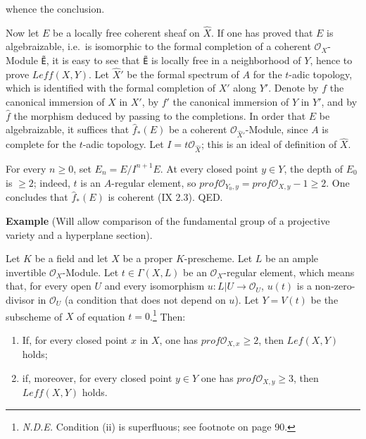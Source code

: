 \documentclass[
]{article}
\providecommand{\tightlist}{%
  \setlength{\itemsep}{0pt}\setlength{\parskip}{0pt}}
\begin{document}
whence the conclusion.

Now let \(E\) be a locally free coherent sheaf on \(\hat{X}\). If one
has proved that \(E\) is algebraizable, i.e.~is isomorphic to the formal
completion of a coherent \(\mathcal{O}_{X}\)-Module \texttt{Ẽ}, it is
easy to see that \texttt{Ẽ} is locally free in a neighborhood of \(Y\),
hence to prove \(Leff(X, Y)\). Let \(\hat{X}'\) be the formal spectrum
of \(A\) for the \(t\)-adic topology, which is identified with the
formal completion of \(X'\) along \(Y'\). Denote by \(f\) the canonical
immersion of \(X\) in \(X'\), by \(f'\) the canonical immersion of \(Y\)
in \(Y'\), and by \(\hat{f}\) the morphism deduced by passing to the
completions. In order that \(E\) be algebraizable, it suffices that
\(\hat{f}_{*}(E)\) be a coherent \(\mathcal{O}_{\hat{X}'}\)-Module,
since \(A\) is complete for the \(t\)-adic topology. Let
\(I = t\mathcal{O}_{\hat{X}}\); this is an ideal of definition of
\(\hat{X}\).

For every \(n \geqslant 0\), set \(E_{n} = E/I^{n+1}E\). At every closed
point \(y \in Y\), the depth of \(E_{0}\) is \(\geqslant 2\); indeed,
\(t\) is an \(A\)-regular element, so
\(prof \mathcal{O}_{Y_{0},y} = prof \mathcal{O}_{X,y} - 1 \geqslant 2\).
One concludes that \(\hat{f}_{*}(E)\) is coherent (IX 2.3). QED.

\textbf{Example} (Will allow comparison of the fundamental group of a
projective variety and a hyperplane section).

Let \(K\) be a field and let \(X\) be a proper \(K\)-prescheme. Let
\(L\) be an ample invertible \(\mathcal{O}_{X}\)-Module. Let
\(t \in \Gamma(X, L)\) be an \(\mathcal{O}_{X}\)-regular element, which
means that, for every open \(U\) and every isomorphism
\(u: L|U \to \mathcal{O}_{U}\), \(u(t)\) is a non-zero-divisor in
\(\mathcal{O}_{U}\) (a condition that does not depend on \(u\)). Let
\(Y = V(t)\) be the subscheme of \(X\) of equation \(t = 0\).\footnote{\emph{N.D.E.}
  Condition (ii) is superfluous; see footnote on page 90.} Then:

\begin{enumerate}
\def\labelenumi{\arabic{enumi}.}
\tightlist
\item
  If, for every closed point \(x\) in \(X\), one has
  \(prof \mathcal{O}_{X,x} \geqslant 2\), then \(Lef(X, Y)\) holds;
\item
  if, moreover, for every closed point \(y \in Y\) one has
  \(prof \mathcal{O}_{X,y} \geqslant 3\), then \(Leff(X, Y)\) holds.
\end{enumerate}
\end{document}
